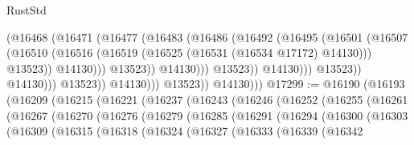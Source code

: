 \begin{lexlean}{RustStd}
\begin{coremodule}
                                          (@16468
                                            (@16471
                                              (@16477
                                                (@16483
                                                  (@16486
                                                    (@16492
                                                      (@16495
                                                        (@16501
                                                          (@16507
                                                            (@16510
                                                              (@16516
                                                                (@16519
                                                                  (@16525
                                                                    (@16531
                                                                      (@16534 @17172)
                                                                      @14130)))
                                                                @13523))
                                                            @14130)))
                                                      @13523))
                                                  @14130)))
                                            @13523))
                                        @14130)))
                                  @13523))
                              @14130)))
                        @13523))
                    @14130)))
              @13523))
          @14130)))
@17299 := @16190
    (@16193
      (@16209
        (@16215
          (@16221
            (@16237
              (@16243
                (@16246
                  (@16252
                    (@16255
                      (@16261
                        (@16267
                          (@16270
                            (@16276
                              (@16279
                                (@16285
                                  (@16291
                                    (@16294
                                      (@16300
                                        (@16303
                                          (@16309
                                            (@16315
                                              (@16318
                                                (@16324
                                                  (@16327
                                                    (@16333
                                                      (@16339
                                                        (@16342

\end{coremodule}
\end{lexlean}
